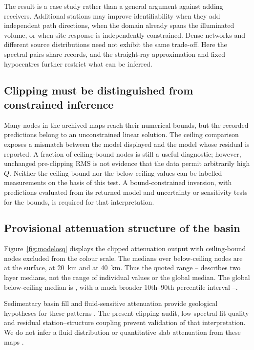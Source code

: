 \documentclass[review,authoryear,longtitle]{elsarticle}
\begin{document}
The result is a case study rather than a general argument against adding
receivers. Additional stations may improve identifiability when they add
independent path directions, when the domain already spans the illuminated
volume, or when site response is independently constrained. Dense networks
and different source distributions need not exhibit the same trade-off.
Here the spectral pairs share records, and the straight-ray approximation
and fixed hypocentres further restrict what can be inferred.

\subsection{Clipping must be distinguished from constrained inference}

Many nodes in the archived maps reach their numerical bounds, but the
recorded predictions belong to an unconstrained linear solution. The
ceiling comparison exposes a mismatch between the model displayed and the
model whose residual is reported. A fraction of ceiling-bound nodes is
still a useful diagnostic; however, unchanged pre-clipping RMS is not
evidence that the data permit arbitrarily high $Q$.
Neither the ceiling-bound nor the below-ceiling values can be labelled
measurements on the basis of this test. A bound-constrained inversion,
with predictions evaluated from its returned model and uncertainty or
sensitivity tests for the bounds, is required for that interpretation.

\subsection{Provisional attenuation structure of the basin}

Figure~\ref{fig:modelosq} displays the clipped attenuation output with
ceiling-bound nodes excluded from the colour scale. The medians over
below-ceiling nodes are \qLibreZSup{} at the surface,
\qLibreZVeinte{} at \SI{20}{\kilo\metre} and \qLibreZCuarenta{} at
\SI{40}{\kilo\metre}. Thus the quoted range
\qLibreZVeinte--\qLibreZCuarenta{} describes two layer medians,
not the range of individual values or the global median.
The global below-ceiling median is \qLibreMediana{}, with a much broader
10th--90th percentile interval \qLibreDiez--\qLibreNoventa.

Sedimentary basin fill and fluid-sensitive attenuation provide geological
hypotheses for these patterns \citep{Mavko2009,Biot1956,QuanHarris1997,
MojicaFranco1990,GomezTapias2019,Londono2022Attenuation,Castelblanco2025Attenuation}.
The present clipping audit, low spectral-fit quality and residual
station--structure coupling prevent validation of that interpretation.
We do not infer a fluid distribution or quantitative slab attenuation
from these maps \citep{EberhartPhillipsChadwick2002,JinEtAl2021}.
\end{document}
